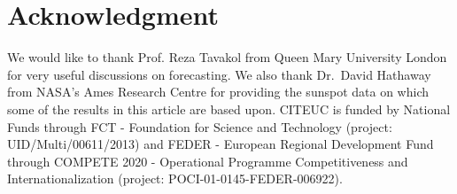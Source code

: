 \documentclass[journal]{IEEEtran}
\begin{document}



\section*{Acknowledgment}
We would like to thank Prof. Reza Tavakol from Queen Mary University London for very useful discussions on forecasting. We also thank
Dr.\ David Hathaway from NASA's Ames Research Centre for providing the sunspot data on which some of the results in this article are based upon.
CITEUC is funded by National Funds through FCT - Foundation for Science
and Technology (project: UID/Multi/00611/2013) and FEDER - European
Regional Development Fund through
COMPETE 2020 - Operational Programme Competitiveness and
Internationalization (project: POCI-01-0145-FEDER-006922).

\ifCLASSOPTIONcaptionsoff
  \newpage
\fi




\end{document}
